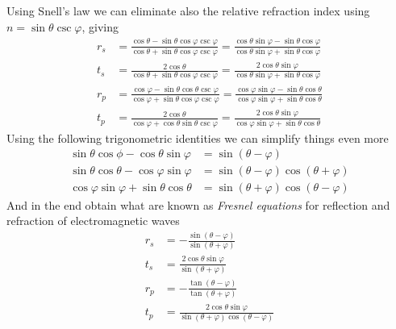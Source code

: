 \documentclass[../electromagnetism.tex]{subfiles}
\begin{document}
Using Snell's law we can eliminate also the relative refraction index using $n=\sin\theta\csc\varphi$, giving
\begin{equation}
	\begin{aligned}
		r_s&= \frac{\cos\theta-\sin\theta\cos\varphi\csc\varphi}{\cos\theta+\sin\theta\cos\varphi\csc\varphi}=\frac{\cos\theta\sin\varphi-\sin\theta\cos\varphi}{\cos\theta\sin\varphi+\sin\theta\cos\varphi}\\
		t_s&= \frac{2\cos\theta}{\cos\theta+\sin\theta\cos\varphi\csc\varphi}=\frac{2\cos\theta\sin\varphi}{\cos\theta\sin\varphi+\sin\theta\cos\varphi}\\
		r_p&= \frac{\cos\varphi-\sin\theta\cos\theta\csc\varphi}{\cos\varphi+\sin\theta\cos\varphi\csc\varphi}=\frac{\cos\varphi\sin\varphi-\sin\theta\cos\theta}{\cos\varphi\sin\varphi+\sin\theta\cos\theta}\\
		t_p&= \frac{2\cos\theta}{\cos\varphi+\cos\theta\sin\theta\csc\varphi}=\frac{2\cos\theta\sin\varphi}{\cos\varphi\sin\varphi+\sin\theta\cos\theta}
	\end{aligned}
	\label{eq:fresnelpre.ref}
\end{equation}
Using the following trigonometric identities we can simplify things even more
\begin{equation*}
	\begin{aligned}
		\sin\theta\cos\phi-\cos\theta\sin\varphi&= \sin(\theta-\varphi)\\
		\sin\theta\cos\theta-\cos\varphi\sin\varphi&= \sin(\theta-\varphi)\cos(\theta+\varphi)\\
		\cos\varphi\sin\varphi+\sin\theta\cos\theta&= \sin(\theta+\varphi)\cos(\theta-\varphi)
	\end{aligned}
\end{equation*}
And in the end obtain what are known as \textit{Fresnel equations} for reflection and refraction of electromagnetic waves
\begin{equation}
	\begin{aligned}
		r_s&= -\frac{\sin(\theta-\varphi)}{\sin(\theta+\varphi)}\\
		t_s&= \frac{2\cos\theta\sin\varphi}{\sin(\theta+\varphi)}\\
		r_p&= -\frac{\tan(\theta-\varphi)}{\tan(\theta+\varphi)}\\
		t_p&= \frac{2\cos\theta\sin\varphi}{\sin(\theta+\varphi)\cos(\theta-\varphi)}
	\end{aligned}
	\label{eq:fresnel.ref}
\end{equation}
\end{document}
